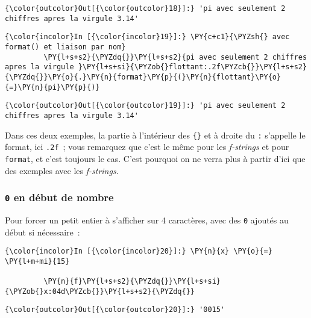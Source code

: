 \begin{Verbatim}[commandchars=\\\{\}]
{\color{outcolor}Out[{\color{outcolor}18}]:} 'pi avec seulement 2 chiffres apres la virgule 3.14'
\end{Verbatim}
            
    \begin{Verbatim}[commandchars=\\\{\}]
{\color{incolor}In [{\color{incolor}19}]:} \PY{c+c1}{\PYZsh{} avec format() et liaison par nom}
         \PY{l+s+s2}{\PYZdq{}}\PY{l+s+s2}{pi avec seulement 2 chiffres apres la virgule }\PY{l+s+si}{\PYZob{}flottant:.2f\PYZcb{}}\PY{l+s+s2}{\PYZdq{}}\PY{o}{.}\PY{n}{format}\PY{p}{(}\PY{n}{flottant}\PY{o}{=}\PY{n}{pi}\PY{p}{)}
\end{Verbatim}


\begin{Verbatim}[commandchars=\\\{\}]
{\color{outcolor}Out[{\color{outcolor}19}]:} 'pi avec seulement 2 chiffres apres la virgule 3.14'
\end{Verbatim}
            
    Dans ces deux exemples, la partie à l'intérieur des \texttt{\{\}} et à
droite du \texttt{:} s'appelle le format, ici \texttt{.2f}~; vous
remarquez que c'est le même pour les \emph{f-strings} et pour
\texttt{format}, et c'est toujours le cas. C'est pourquoi on ne verra
plus à partir d'ici que des exemples avec les \emph{f-strings}.

    \hypertarget{en-duxe9but-de-nombre}{%
\subsubsection{\texorpdfstring{\texttt{0} en début de
nombre}{0 en début de nombre}}\label{en-duxe9but-de-nombre}}

    Pour forcer un petit entier à s'afficher sur 4 caractères, avec des
\texttt{0} ajoutés au début si nécessaire~:

    \begin{Verbatim}[commandchars=\\\{\}]
{\color{incolor}In [{\color{incolor}20}]:} \PY{n}{x} \PY{o}{=} \PY{l+m+mi}{15}
         
         \PY{n}{f}\PY{l+s+s2}{\PYZdq{}}\PY{l+s+si}{\PYZob{}x:04d\PYZcb{}}\PY{l+s+s2}{\PYZdq{}}
\end{Verbatim}


\begin{Verbatim}[commandchars=\\\{\}]
{\color{outcolor}Out[{\color{outcolor}20}]:} '0015'
\end{Verbatim}
            
